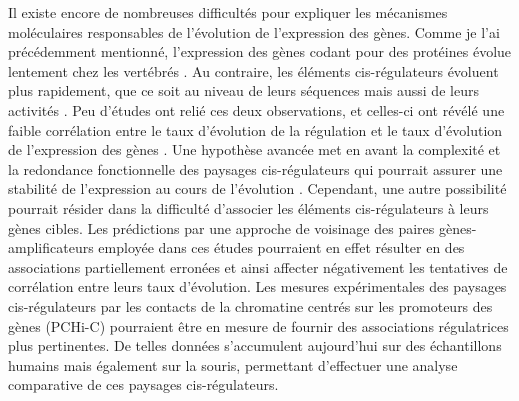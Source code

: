 \newpage

Il existe encore de nombreuses difficultés pour expliquer les mécanismes moléculaires responsables de l’évolution de l’expression des gènes. Comme je l’ai précédemment mentionné, l'expression des gènes codant pour des protéines évolue lentement chez les vertébrés \citep{brawand_evolution_2011, necsulea_evolutionary_2014, cardoso-moreira_gene_2019}. Au contraire, les éléments \acrshort{cis}-régulateurs évoluent plus rapidement, que ce soit au niveau de leurs séquences mais aussi de leurs activités \citep{cheng_principles_2014, villar_enhancer_2015}. Peu d’études ont relié ces deux observations, et celles-ci ont révélé une faible corrélation entre le taux d’évolution de la régulation et le taux d’évolution de l’expression des gènes \citep{wong_interplay_2017, berthelot_complexity_2018}. Une hypothèse avancée met en avant la complexité et la redondance fonctionnelle des paysages \acrshort{cis}-régulateurs qui pourrait assurer une stabilité de l’expression au cours de l’évolution \citep{osterwalder_enhancer_2018, berthelot_complexity_2018}. Cependant, une autre possibilité pourrait résider dans la difficulté d’associer les éléments \acrshort{cis}-régulateurs à leurs gènes cibles. Les prédictions par une approche de voisinage des paires gènes-amplificateurs employée dans ces études pourraient en effet résulter en des associations partiellement erronées et ainsi affecter négativement les tentatives de corrélation entre leurs taux d’évolution. Les mesures expérimentales des paysages \acrshort{cis}-régulateurs par les contacts de la chromatine centrés sur les promoteurs des gènes (PCHi-C) pourraient être en mesure de fournir des associations régulatrices plus pertinentes. De telles données s’accumulent aujourd’hui sur des échantillons humains mais également sur la souris, permettant d’effectuer une analyse comparative de ces paysages \acrshort{cis}-régulateurs.\\

